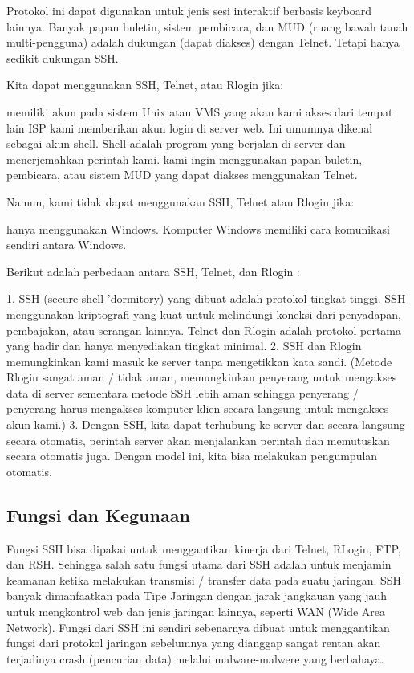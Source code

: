 Protokol ini dapat digunakan untuk jenis sesi interaktif berbasis keyboard lainnya. Banyak papan buletin, sistem pembicara, dan MUD (ruang bawah tanah multi-pengguna) adalah dukungan (dapat diakses) dengan Telnet. Tetapi hanya sedikit dukungan SSH.

Kita dapat menggunakan SSH, Telnet, atau Rlogin jika:

    memiliki akun pada sistem Unix atau VMS yang akan kami akses dari tempat lain
    ISP kami memberikan akun login di server web. Ini umumnya dikenal sebagai akun shell. Shell adalah program yang berjalan di server dan menerjemahkan perintah kami.
    kami ingin menggunakan papan buletin, pembicara, atau sistem MUD yang dapat diakses menggunakan Telnet.

Namun, kami tidak dapat menggunakan SSH, Telnet atau Rlogin jika:

    hanya menggunakan Windows. Komputer Windows memiliki cara komunikasi sendiri antara Windows.

	Berikut adalah perbedaan antara SSH, Telnet, dan Rlogin :

1. SSH (secure shell 'dormitory) yang dibuat adalah protokol tingkat tinggi. SSH menggunakan kriptografi yang kuat untuk melindungi koneksi dari penyadapan, pembajakan, atau serangan lainnya. Telnet dan Rlogin adalah protokol pertama yang hadir dan hanya menyediakan tingkat minimal.
2. SSH dan Rlogin memungkinkan kami masuk ke server tanpa mengetikkan kata sandi. (Metode Rlogin sangat aman / tidak aman, memungkinkan penyerang untuk mengakses data di server sementara metode SSH lebih aman sehingga penyerang / penyerang harus mengakses komputer klien secara langsung untuk mengakses akun kami.)
3. Dengan SSH, kita dapat terhubung ke server dan secara langsung secara otomatis, perintah server akan menjalankan perintah dan memutuskan secara otomatis juga. Dengan model ini, kita bisa melakukan pengumpulan otomatis.


\subsection {Fungsi dan Kegunaan}

Fungsi SSH bisa dipakai untuk menggantikan kinerja dari Telnet, RLogin, FTP, dan RSH. Sehingga salah satu fungsi utama dari SSH adalah untuk menjamin keamanan ketika melakukan transmisi / transfer data pada suatu jaringan. SSH banyak dimanfaatkan pada Tipe Jaringan dengan jarak jangkauan yang jauh untuk mengkontrol web dan jenis jaringan lainnya, seperti WAN (Wide Area Network). Fungsi dari SSH ini sendiri sebenarnya dibuat untuk menggantikan fungsi dari protokol jaringan sebelumnya yang dianggap sangat rentan akan terjadinya crash (pencurian data) melalui malware-malwere yang berbahaya.

